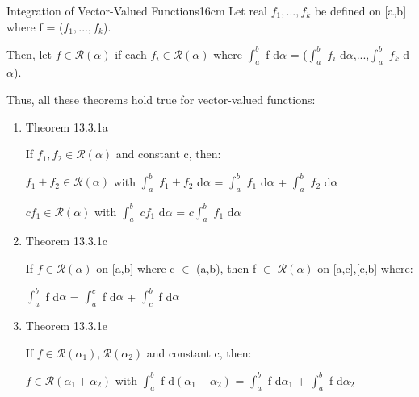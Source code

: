     \begin{definition}{Integration of Vector-Valued Functions}{16cm}
        Let real $f_1,...,f_k$ be defined on [a,b] where f = ($f_1,...,f_k$).

        Then, let $f \in \mathscr{R}(\alpha)$ if each $f_i \in \mathscr{R}(\alpha)$
        where $\int_a^b$ f d$\alpha$
        = ($\int_a^b$ $f_i$ d$\alpha$,...,$\int_a^b$ $f_k$ d$\alpha$).

        \vspace{0.2cm}

        Thus, all these theorems hold true for vector-valued functions:

        \begin{enumerate}[label=(\alph*), leftmargin=1.5cm, itemsep=0.1cm]
            \item {\color{red} Theorem 13.3.1a}
            
                If $f_1,f_2 \in \mathscr{R}(\alpha)$ and constant c, then:

                \hspace{0.5cm}
                $f_1 + f_2 \in \mathscr{R}(\alpha)$ with
                $\int_a^b$ $f_1 + f_2$ d$\alpha$
                = $\int_a^b$ $f_1$ d$\alpha$ + $\int_a^b$ $f_2$ d$\alpha$

                \hspace{0.5cm}
                $cf_1 \in \mathscr{R}(\alpha)$ with
                $\int_a^b$ $cf_1$ d$\alpha$
                = $c\int_a^b$ $f_1$ d$\alpha$

            \item {\color{red} Theorem 13.3.1c}

                If $f \in \mathscr{R}(\alpha)$ on [a,b] where c $\in$ (a,b), then
                f $\in$ $\mathscr{R}(\alpha)$ on [a,c],[c,b] where:
                
                \hspace{0.5cm}
                $\int_a^b$ f d$\alpha$
                = $\int_a^c$ f d$\alpha$ + $\int_c^b$ f d$\alpha$

            \item {\color{red} Theorem 13.3.1e}

                If $f \in \mathscr{R}(\alpha_1),\mathscr{R}(\alpha_2)$ and
                constant c, then:

                \hspace{0.5cm}
                $f \in \mathscr{R}(\alpha_1+\alpha_2)$ with
                $\int_a^b$ f d$(\alpha_1+\alpha_2)$
                = $\int_a^b$ f d$\alpha_1$ + $\int_a^b$ f d$\alpha_2$


\end{enumerate}
\end{definition}
